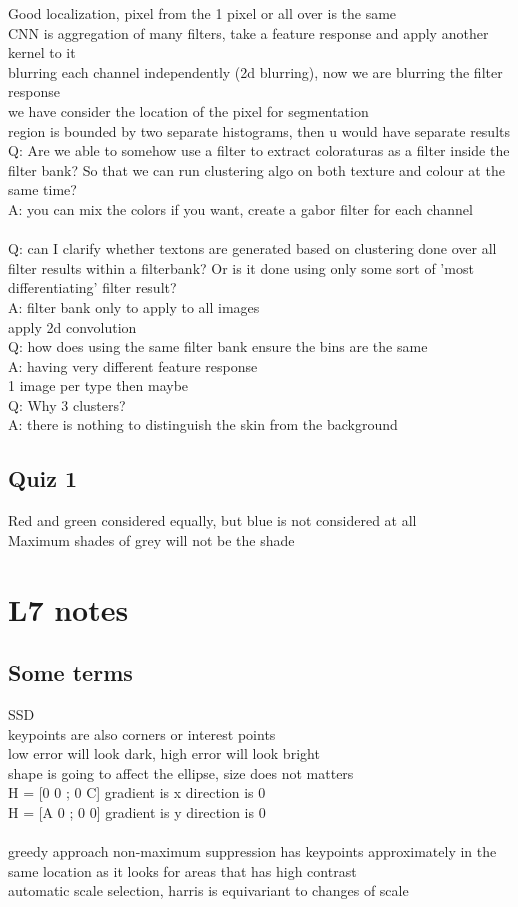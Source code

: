 \documentclass[11pt]{article}
\begin{document}
Good localization, pixel from the 1 pixel or all over is the same
\\
CNN is aggregation of many filters, take a feature response and apply another kernel to it
\\
blurring each channel independently (2d blurring),
now we are blurring the filter response
\\
we have consider the location of the pixel for segmentation
\\
region is bounded by two separate histograms, then u would have separate results
\\
Q: Are we able to somehow use a filter to extract coloraturas as a filter inside the filter bank? So that we can run clustering algo on both texture and colour at the same time?\\
A: you can mix the colors if you want, create a gabor filter for each channel\\
\\
Q: can I clarify whether textons are generated based on clustering done over all filter results within a filterbank? Or is it done using only some sort of 'most differentiating' filter result?\\
A: filter bank only to apply to all images
\\
apply 2d convolution
\\
Q: how does using the same filter bank ensure the bins are the same\\
A: having very different feature response\\
1 image per type then maybe
\\
Q: Why 3 clusters?\\
A: there is nothing to distinguish the skin from the background
\\
\subsection*{Quiz 1}
Red and green considered equally, but blue is not considered at all\\
Maximum shades of grey will not be the shade
\\
\section*{L7 notes}
\subsection*{Some terms}
SSD\\
keypoints are also corners or interest points\\
low error will look dark, high error will look bright\\
shape is going to affect the ellipse, size does not matters	\\
H = [0 0 ; 0 C] gradient is x direction is 0\\
H = [A 0 ; 0 0] gradient is y direction is 0\\
\\
greedy approach non-maximum suppression has keypoints approximately in the same location as it looks for areas that has high contrast
\\
automatic scale selection, harris is equivariant to changes of scale\\
\end{document}
